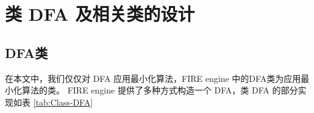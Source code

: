 \chapter{类 DFA 及相关类的设计}\label{cha:construct-dfa}

\section{DFA类}
在本文中，我们仅仅对 DFA 应用最小化算法，FIRE engine 中的DFA类为应用最小化算法的类。
FIRE engine 提供了多种方式构造一个 DFA，类 DFA 的部分实现如表 \ref{tab:Class-DFA} 



